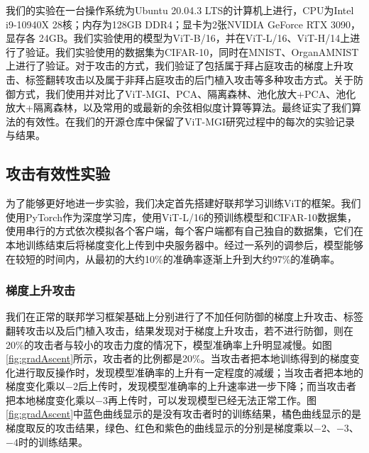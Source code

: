 \documentclass[conference]{IEEEtran}
\begin{document}
我们的实验在一台操作系统为Ubuntu 20.04.3 LTS的计算机上进行，CPU为Intel i9-10940X 28核；内存为128GB DDR4；显卡为2张NVIDIA GeForce RTX 3090，显存各 24GB。我们实验使用的模型为ViT-B/16，并在ViT-L/16、ViT-H/14上进行了验证。我们实验使用的数据集为CIFAR-10，同时在MNIST、OrganAMNIST上进行了验证。对于攻击的方式，我们验证了包括属于拜占庭攻击的梯度上升攻击、标签翻转攻击以及属于非拜占庭攻击的后门植入攻击等多种攻击方式。关于防御方式，我们使用并对比了ViT-MGI、PCA、隔离森林、池化放大\cite{betterTogether}+PCA、池化放大+隔离森林，以及常用的或最新的余弦相似度计算等算法。最终证实了我们算法的有效性。在我们的开源仓库中保留了ViT-MGI研究过程中的每次的实验记录与结果。

\subsection{攻击有效性实验}
\label{exp:attack}

为了能够更好地进一步实验，我们决定首先搭建好联邦学习训练ViT的框架。我们使用PyTorch作为深度学习库，使用ViT-L/16的预训练模型和CIFAR-10数据集，使用串行的方式依次模拟各个客户端，每个客户端都有自己独自的数据集，它们在本地训练结束后将梯度变化上传到中央服务器中。经过一系列的调参后，模型能够在较短的时间内，从最初的大约10\%的准确率逐渐上升到大约97\%的准确率。

\subsubsection{\textbf{梯度上升攻击}}
\label{exp:attack:grad}

我们在正常的联邦学习框架基础上分别进行了不加任何防御的梯度上升攻击、标签翻转攻击以及后门植入攻击，结果发现对于梯度上升攻击，若不进行防御，则在20\%的攻击者与较小的攻击力度的情况下，模型准确率上升明显减慢。如图\hyperref[fig:gradAscent]{\ref{fig:gradAscent}}所示，攻击者的比例都是20\%。当攻击者把本地训练得到的梯度变化进行取反操作时，发现模型准确率的上升有一定程度的减缓；当攻击者把本地的梯度变化乘以$-2$后上传时，发现模型准确率的上升速率进一步下降；而当攻击者把本地梯度变化乘以$-3$再上传时，可以发现模型已经无法正常工作。图\hyperref[fig:gradAscent]{\ref{fig:gradAscent}}中蓝色曲线显示的是没有攻击者时的训练结果，橘色曲线显示的是梯度取反的攻击结果，绿色、红色和紫色的曲线显示的分别是梯度乘以$-2$、$-3$、$-4$时的训练结果。
\end{document}
